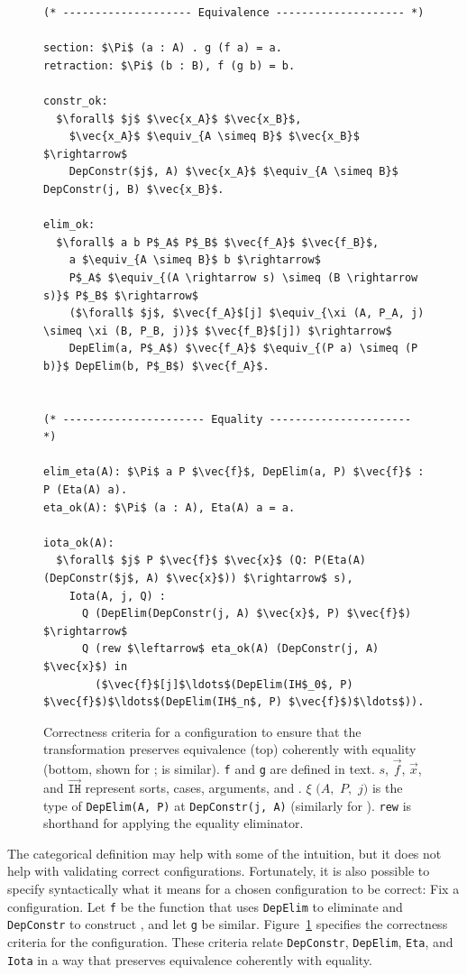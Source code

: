 \begin{figure}
\begin{lstlisting}
(* -------------------- Equivalence -------------------- *)

section: $\Pi$ (a : A) . g (f a) = a.
retraction: $\Pi$ (b : B), f (g b) = b.

constr_ok:
  $\forall$ $j$ $\vec{x_A}$ $\vec{x_B}$,
    $\vec{x_A}$ $\equiv_{A \simeq B}$ $\vec{x_B}$ $\rightarrow$
    DepConstr($j$, A) $\vec{x_A}$ $\equiv_{A \simeq B}$ DepConstr(j, B) $\vec{x_B}$.

elim_ok:
  $\forall$ a b P$_A$ P$_B$ $\vec{f_A}$ $\vec{f_B}$,
    a $\equiv_{A \simeq B}$ b $\rightarrow$
    P$_A$ $\equiv_{(A \rightarrow s) \simeq (B \rightarrow s)}$ P$_B$ $\rightarrow$
    ($\forall$ $j$, $\vec{f_A}$[j] $\equiv_{\xi (A, P_A, j) \simeq \xi (B, P_B, j)}$ $\vec{f_B}$[j]) $\rightarrow$
    DepElim(a, P$_A$) $\vec{f_A}$ $\equiv_{(P a) \simeq (P b)}$ DepElim(b, P$_B$) $\vec{f_A}$.


(* ---------------------- Equality ---------------------- *)

elim_eta(A): $\Pi$ a P $\vec{f}$, DepElim(a, P) $\vec{f}$ : P (Eta(A) a).
eta_ok(A): $\Pi$ (a : A), Eta(A) a = a.

iota_ok(A):
  $\forall$ $j$ P $\vec{f}$ $\vec{x}$ (Q: P(Eta(A) (DepConstr($j$, A) $\vec{x}$)) $\rightarrow$ s),
    Iota(A, j, Q) : 
      Q (DepElim(DepConstr(j, A) $\vec{x}$, P) $\vec{f}$) $\rightarrow$ 
      Q (rew $\leftarrow$ eta_ok(A) (DepConstr(j, A) $\vec{x}$) in 
        ($\vec{f}$[j]$\ldots$(DepElim(IH$_0$, P) $\vec{f}$)$\ldots$(DepElim(IH$_n$, P) $\vec{f}$)$\ldots$)).
\end{lstlisting}
\caption{Correctness criteria for a configuration to ensure that the transformation
preserves equivalence (top) coherently with equality (bottom, shown for \Aa; \B is similar). \lstinline{f} and \lstinline{g} are defined in text. $s$, $\vec{f}$, $\vec{x}$, and $\vec{\mathtt{IH}}$ represent
sorts,  cases,  arguments, and . $\xi$ $(A,$ $P,$ $j)$ is the type 
of \lstinline{DepElim(A, P)} at \lstinline{DepConstr(j, A)} (similarly for \B).
\lstinline{rew} is shorthand for applying the equality eliminator.} %
\label{fig:spec}
\end{figure}

The categorical definition may help with some of the intuition, but it does not help with validating correct configurations.
Fortunately, it is also possible to specify syntactically
what it means for a chosen configuration to be correct:
Fix a configuration. Let \lstinline{f} be the function that uses \lstinline{DepElim} to eliminate \Aa and \lstinline{DepConstr} to construct \B,
and let \lstinline{g} be similar.
Figure~\ref{fig:spec} specifies the correctness criteria for the configuration.
These criteria relate \lstinline{DepConstr}, \lstinline{DepElim}, \lstinline{Eta}, and \lstinline{Iota}
in a way that preserves equivalence coherently with equality.

